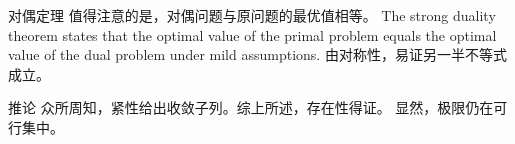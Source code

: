 \documentclass[aspectratio=169]{beamer}
\begin{document}
\begin{frame}{对偶定理}
  值得注意的是，对偶问题与原问题的最优值相等。
  The strong duality theorem states that the optimal value of the primal problem
  equals the optimal value of the dual problem under mild assumptions.
  由对称性，易证另一半不等式成立。
\end{frame}

\begin{frame}{推论}
  众所周知，紧性给出收敛子列。综上所述，存在性得证。
  显然，极限仍在可行集中。
\end{frame}
\end{document}
